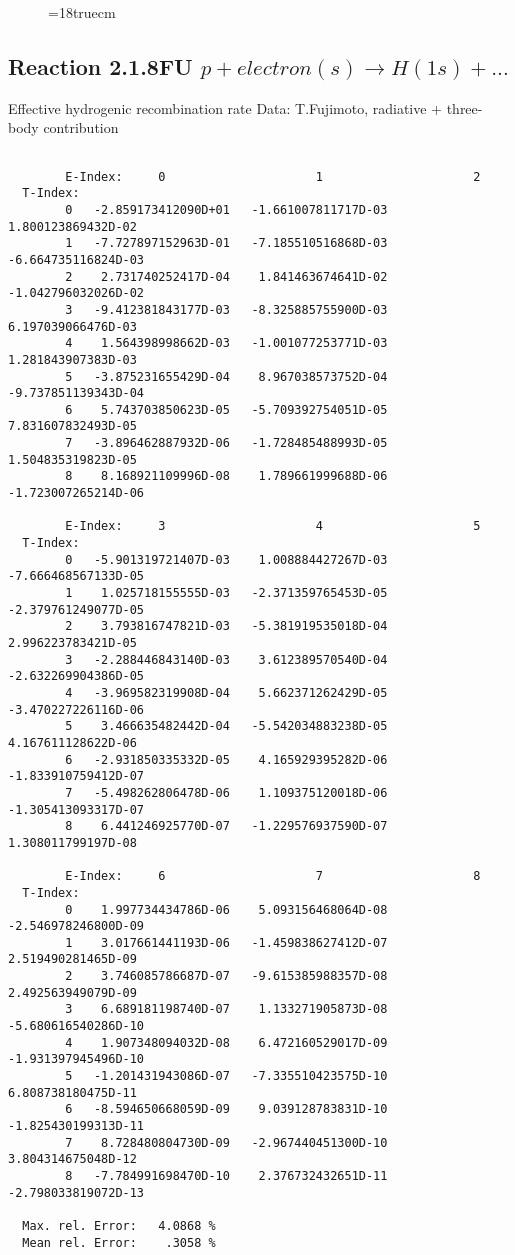 \begin{figure} \label{2.1.8o}
\epsfxsize=18truecm
\end{figure}
\newpage

\subsection{
  Reaction 2.1.8FU $ p + electron(s) \rightarrow H(1s) + ...$
}

   Effective hydrogenic recombination rate
   Data: T.Fujimoto, radiative + three-body contribution


\begin{verbatim}

        E-Index:     0                     1                     2
  T-Index:
        0   -2.859173412090D+01   -1.661007811717D-03    1.800123869432D-02
        1   -7.727897152963D-01   -7.185510516868D-03   -6.664735116824D-03
        2    2.731740252417D-04    1.841463674641D-02   -1.042796032026D-02
        3   -9.412381843177D-03   -8.325885755900D-03    6.197039066476D-03
        4    1.564398998662D-03   -1.001077253771D-03    1.281843907383D-03
        5   -3.875231655429D-04    8.967038573752D-04   -9.737851139343D-04
        6    5.743703850623D-05   -5.709392754051D-05    7.831607832493D-05
        7   -3.896462887932D-06   -1.728485488993D-05    1.504835319823D-05
        8    8.168921109996D-08    1.789661999688D-06   -1.723007265214D-06

        E-Index:     3                     4                     5
  T-Index:
        0   -5.901319721407D-03    1.008884427267D-03   -7.666468567133D-05
        1    1.025718155555D-03   -2.371359765453D-05   -2.379761249077D-05
        2    3.793816747821D-03   -5.381919535018D-04    2.996223783421D-05
        3   -2.288446843140D-03    3.612389570540D-04   -2.632269904386D-05
        4   -3.969582319908D-04    5.662371262429D-05   -3.470227226116D-06
        5    3.466635482442D-04   -5.542034883238D-05    4.167611128622D-06
        6   -2.931850335332D-05    4.165929395282D-06   -1.833910759412D-07
        7   -5.498262806478D-06    1.109375120018D-06   -1.305413093317D-07
        8    6.441246925770D-07   -1.229576937590D-07    1.308011799197D-08

        E-Index:     6                     7                     8
  T-Index:
        0    1.997734434786D-06    5.093156468064D-08   -2.546978246800D-09
        1    3.017661441193D-06   -1.459838627412D-07    2.519490281465D-09
        2    3.746085786687D-07   -9.615385988357D-08    2.492563949079D-09
        3    6.689181198740D-07    1.133271905873D-08   -5.680616540286D-10
        4    1.907348094032D-08    6.472160529017D-09   -1.931397945496D-10
        5   -1.201431943086D-07   -7.335510423575D-10    6.808738180475D-11
        6   -8.594650668059D-09    9.039128783831D-10   -1.825430199313D-11
        7    8.728480804730D-09   -2.967440451300D-10    3.804314675048D-12
        8   -7.784991698470D-10    2.376732432651D-11   -2.798033819072D-13

  Max. rel. Error:   4.0868 %
  Mean rel. Error:    .3058 %

\end{verbatim}
